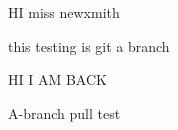 \documentclass[a4 paper,12pt]{article}
\begin{document}
HI  miss newxmith

this testing is git a branch

HI I AM BACK

A-branch pull test　
\end{document}
